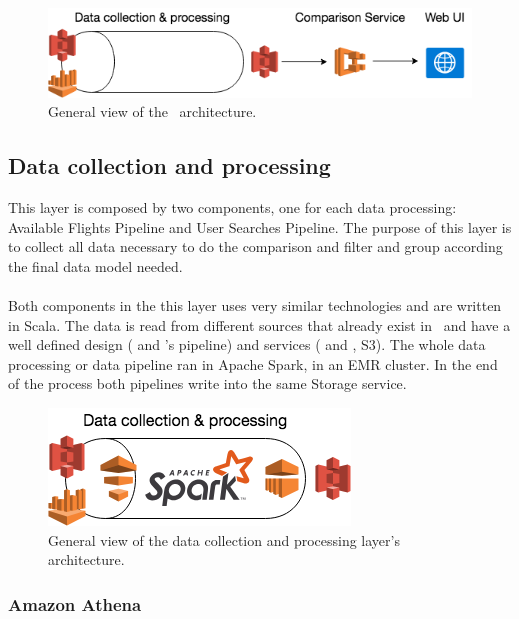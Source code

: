\begin{figure}[H]
\centering
\includegraphics[scale=0.7]{diagrams/architecture01.png}
\caption{General view of the \thesis\ architecture.}
\end{figure}


\subsection{Data collection and processing} \label{data_layer}

This layer is composed by two components, one for each data processing: Available Flights Pipeline and User Searches Pipeline. The purpose of this layer is to collect all data necessary to do the comparison and filter and group according the final data model needed.
\\\\
Both components in the this layer uses very similar technologies and are written in Scala\cite{scala}. The data is read from different sources that already exist in \company\ and have a well defined design ( and \squad's pipeline) and services ( and , S3). The whole data processing or data pipeline ran in Apache Spark, in an EMR cluster. In the end of the process both pipelines write into the same Storage service.

\begin{figure}[H]
\centering
\includegraphics[scale=0.7]{diagrams/architecture-data.png}
\caption{General view of the data collection and processing layer's architecture.}
\end{figure}

\subsubsection{Amazon Athena} \label{athena}

